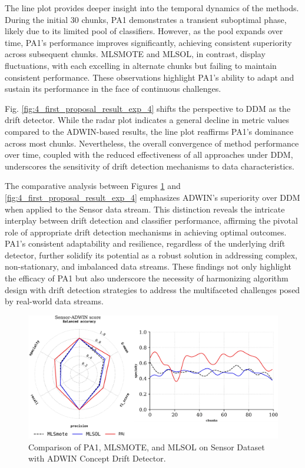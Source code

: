 The line plot provides deeper insight into the temporal dynamics of the methods. During the initial 30 chunks, PA1 demonstrates a transient suboptimal phase, likely due to its limited pool of classifiers. However, as the pool expands over time, PA1's performance improves significantly, achieving consistent superiority across subsequent chunks. MLSMOTE and MLSOL, in contrast, display fluctuations, with each excelling in alternate chunks but failing to maintain consistent performance. These observations highlight PA1's ability to adapt and sustain its performance in the face of continuous challenges.

Fig. \ref{fig:4_first_proposal_result_exp_4} shifts the perspective to DDM as the drift detector. While the radar plot indicates a general decline in metric values compared to the ADWIN-based results, the line plot reaffirms PA1's dominance across most chunks. Nevertheless, the overall convergence of method performance over time, coupled with the reduced effectiveness of all approaches under DDM, underscores the sensitivity of drift detection mechanisms to data characteristics.

The comparative analysis between Figures \ref{fig:4_first_proposal_result_exp_3} and \ref{fig:4_first_proposal_result_exp_4} emphasizes ADWIN's superiority over DDM when applied to the Sensor data stream. This distinction reveals the intricate interplay between drift detection and classifier performance, affirming the pivotal role of appropriate drift detection mechanisms in achieving optimal outcomes. PA1’s consistent adaptability and resilience, regardless of the underlying drift detector, further solidify its potential as a robust solution in addressing complex, non-stationary, and imbalanced data streams. These findings not only highlight the efficacy of PA1 but also underscore the necessity of harmonizing algorithm design with drift detection strategies to address the multifaceted challenges posed by real-world data streams.
 
\begin{figure}[!ht]
	\centering
	\includegraphics[width=1\linewidth]{4_Imbalanced/figures/exp_3.png}
  \caption{Comparison of PA1, MLSMOTE, and MLSOL on Sensor Dataset with ADWIN Concept Drift Detector.}
	\label{fig:4_first_proposal_result_exp_3}
\end{figure}

